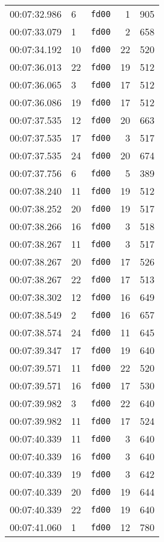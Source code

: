 \documentclass{article}
\begin{document}
\begin{longtable}{lllrr}
00:07:32.986 & 6 & \texttt{fd00} & 1 & 905 \\
00:07:33.079 & 1 & \texttt{fd00} & 2 & 658 \\
00:07:34.192 & 10 & \texttt{fd00} & 22 & 520 \\
00:07:36.013 & 22 & \texttt{fd00} & 19 & 512 \\
00:07:36.065 & 3 & \texttt{fd00} & 17 & 512 \\
00:07:36.086 & 19 & \texttt{fd00} & 17 & 512 \\
00:07:37.535 & 12 & \texttt{fd00} & 20 & 663 \\
00:07:37.535 & 17 & \texttt{fd00} & 3 & 517 \\
00:07:37.535 & 24 & \texttt{fd00} & 20 & 674 \\
00:07:37.756 & 6 & \texttt{fd00} & 5 & 389 \\
00:07:38.240 & 11 & \texttt{fd00} & 19 & 512 \\
00:07:38.252 & 20 & \texttt{fd00} & 19 & 517 \\
00:07:38.266 & 16 & \texttt{fd00} & 3 & 518 \\
00:07:38.267 & 11 & \texttt{fd00} & 3 & 517 \\
00:07:38.267 & 20 & \texttt{fd00} & 17 & 526 \\
00:07:38.267 & 22 & \texttt{fd00} & 17 & 513 \\
00:07:38.302 & 12 & \texttt{fd00} & 16 & 649 \\
00:07:38.549 & 2 & \texttt{fd00} & 16 & 657 \\
00:07:38.574 & 24 & \texttt{fd00} & 11 & 645 \\
00:07:39.347 & 17 & \texttt{fd00} & 19 & 640 \\
00:07:39.571 & 11 & \texttt{fd00} & 22 & 520 \\
00:07:39.571 & 16 & \texttt{fd00} & 17 & 530 \\
00:07:39.982 & 3 & \texttt{fd00} & 22 & 640 \\
00:07:39.982 & 11 & \texttt{fd00} & 17 & 524 \\
00:07:40.339 & 11 & \texttt{fd00} & 3 & 640 \\
00:07:40.339 & 16 & \texttt{fd00} & 3 & 640 \\
00:07:40.339 & 19 & \texttt{fd00} & 3 & 642 \\
00:07:40.339 & 20 & \texttt{fd00} & 19 & 644 \\
00:07:40.339 & 22 & \texttt{fd00} & 19 & 640 \\
00:07:41.060 & 1 & \texttt{fd00} & 12 & 780 \\

\end{longtable}
\end{document}
